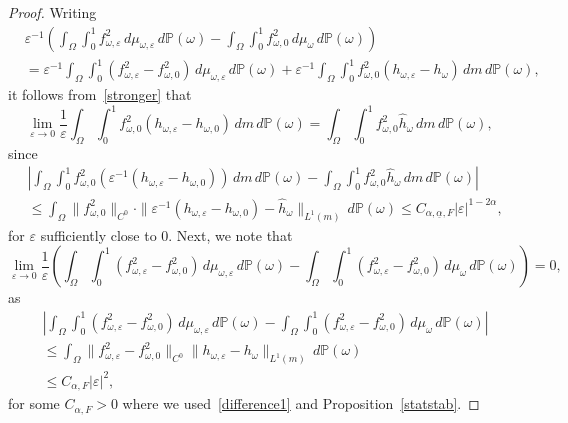 \documentclass[12pt,reqno,a4paper]{article}
\begin{document}
\begin{proof}
	Writing 
	\[
	\begin{split}
		&\varepsilon^{-1}\left (\int_\Omega \int_0^1f_{\omega, \varepsilon}^2 \, d\mu_{\omega, \varepsilon}\, d\mathbb P(\omega)-\int_\Omega \int_0^1f_{\omega, 0}^2 \, d\mu_{\omega}\, d\mathbb P(\omega)\right ) \\
		&=\varepsilon^{-1}\int_\Omega\int_0^1 (f_{\omega, \varepsilon}^2-f_{\omega, 0}^2)\, d\mu_{\omega, \varepsilon}\, d\mathbb P(\omega)+\varepsilon^{-1}\int_\Omega\int_0^1f_{\omega, 0}^2(h_{\omega, \varepsilon}-h_{\omega})\, dm\, d\mathbb P(\omega),
	\end{split}
	\]
	it follows from~\eqref{stronger} that 
	\[
	\lim_{\varepsilon \to 0}\frac{1}{\varepsilon}\int_\Omega \int_0^1f_{\omega, 0}^2(h_{\omega, \varepsilon}-h_{\omega, 0})\, dm\, d\mathbb P(\omega)=\int_\Omega \int_0^1 f_{\omega, 0}^2\hat h_\omega\, dm\, d\mathbb P(\omega), 
	\]
	since 
	\[
	\begin{split}
		&\left |\int_\Omega \int_0^1f_{\omega, 0}^2(\varepsilon^{-1}(h_{\omega, \varepsilon}-h_{\omega, 0}))\, dm\, d\mathbb P(\omega)-\int_\Omega \int_0^1 f_{\omega, 0}^2\hat h_\omega\, dm\, d\mathbb P(\omega)\right | \\
		&\le \int_\Omega \|f_{\omega, 0}^2\|_{C^0}\cdot \|\varepsilon^{-1}(h_{\omega, \varepsilon}-h_{\omega, 0})-\hat h_\omega\|_{L^1(m)}\, d\mathbb P(\omega) \le C_{\alpha, \underline{\alpha}, F}|\varepsilon|^{1-2\alpha},
	\end{split}
	\]
	for $\varepsilon$ sufficiently close to $0$.
	Next, we note that 
	\[
	\lim_{\varepsilon\to 0}\frac{1}{\varepsilon}\left (\int_\Omega\int_0^1 (f_{\omega, \varepsilon}^2-f_{\omega, 0}^2)\, d\mu_{\omega, \varepsilon}\, d\mathbb P(\omega)-\int_\Omega\int_0^1 (f_{\omega, \varepsilon}^2-f_{\omega, 0}^2)\, d\mu_{\omega}\, d\mathbb P(\omega)\right )=0,
	\]
	as
	\[
	\begin{split}
		&\left |\int_\Omega\int_0^1 (f_{\omega, \varepsilon}^2-f_{\omega, 0}^2)\, d\mu_{\omega, \varepsilon}\, d\mathbb P(\omega)-\int_\Omega\int_0^1 (f_{\omega, \varepsilon}^2-f_{\omega, 0}^2)\, d\mu_{\omega}\, d\mathbb P(\omega)\right | \\
		&\le \int_\Omega \|f_{\omega, \varepsilon}^2-f_{\omega, 0}^2\|_{C^0}\|h_{\omega, \varepsilon}-h_\omega \|_{L^1(m)}\, d\mathbb P(\omega) \\
		&\le C_{\alpha, F}|\varepsilon|^2,
	\end{split}
	\]
	for some $C_{\alpha, F}>0$ where we used~\eqref{difference1} and Proposition~\ref{statstab}.

\end{proof}
\end{document}
